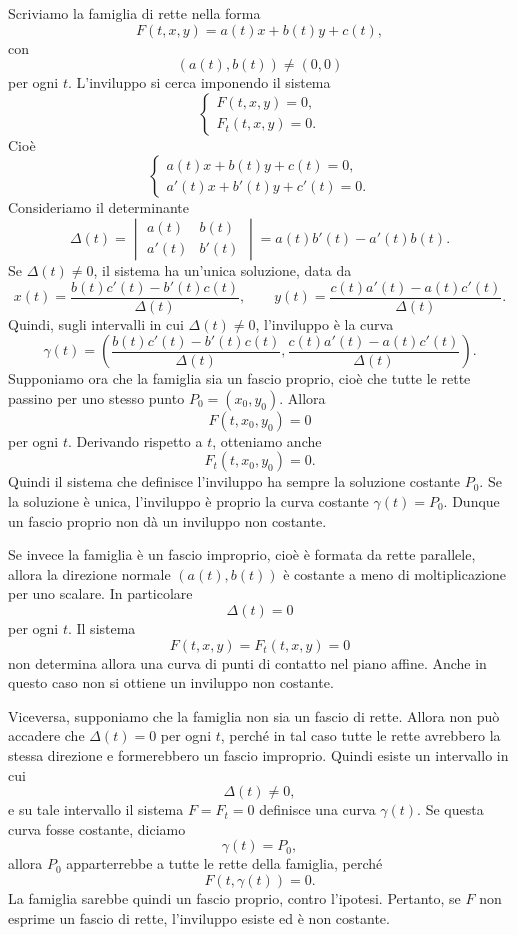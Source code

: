 \documentclass[a4paper]{article}
\begin{document}
\begin{snippetproof}{}
    Scriviamo la famiglia di rette nella forma
    \[
        F(t,x,y)=a(t)x+b(t)y+c(t),
    \]
    con
    \[
        (a(t),b(t))\neq(0,0)
    \]
    per ogni \(t\). L'inviluppo si cerca imponendo il sistema
    \[
        \begin{cases}
            F(t,x,y)=0,\\
            F_t(t,x,y)=0.
        \end{cases}
    \]
    Cioè
    \[
        \begin{cases}
            a(t)x+b(t)y+c(t)=0,\\
            a'(t)x+b'(t)y+c'(t)=0.
        \end{cases}
    \]
    Consideriamo il determinante
    \[
        \Delta(t)=
        \begin{vmatrix}
            a(t) & b(t)\\
            a'(t) & b'(t)
        \end{vmatrix}
        =
        a(t)b'(t)-a'(t)b(t).
    \]
    Se \(\Delta(t)\neq0\), il sistema ha un'unica soluzione, data da
    \[
        x(t)=\frac{b(t)c'(t)-b'(t)c(t)}{\Delta(t)},
        \qquad
        y(t)=\frac{c(t)a'(t)-a(t)c'(t)}{\Delta(t)}.
    \]
    Quindi, sugli intervalli in cui \(\Delta(t)\neq0\), l'inviluppo è la curva
    \[
        \gamma(t)=
        \left(
            \frac{b(t)c'(t)-b'(t)c(t)}{\Delta(t)},
            \frac{c(t)a'(t)-a(t)c'(t)}{\Delta(t)}
        \right).
    \]
    Supponiamo ora che la famiglia sia un fascio proprio, cioè che tutte le rette passino per uno stesso punto \(P_0=(x_0,y_0)\). Allora
    \[
        F(t,x_0,y_0)=0
    \]
    per ogni \(t\). Derivando rispetto a \(t\), otteniamo anche
    \[
        F_t(t,x_0,y_0)=0.
    \]
    Quindi il sistema che definisce l'inviluppo ha sempre la soluzione costante \(P_0\). Se la soluzione è unica, l'inviluppo è proprio la curva costante \(\gamma(t)=P_0\). Dunque un fascio proprio non dà un inviluppo non costante.

    Se invece la famiglia è un fascio improprio, cioè è formata da rette parallele, allora la direzione normale \((a(t),b(t))\) è costante a meno di moltiplicazione per uno scalare. In particolare
    \[
        \Delta(t)=0
    \]
    per ogni \(t\). Il sistema
    \[
        F(t,x,y)=F_t(t,x,y)=0
    \]
    non determina allora una curva di punti di contatto nel piano affine. Anche in questo caso non si ottiene un inviluppo non costante.

    Viceversa, supponiamo che la famiglia non sia un fascio di rette. Allora non può accadere che \(\Delta(t)=0\) per ogni \(t\), perché in tal caso tutte le rette avrebbero la stessa direzione e formerebbero un fascio improprio. Quindi esiste un intervallo in cui
    \[
        \Delta(t)\neq0,
    \]
    e su tale intervallo il sistema \(F=F_t=0\) definisce una curva \(\gamma(t)\). Se questa curva fosse costante, diciamo
    \[
        \gamma(t)=P_0,
    \]
    allora \(P_0\) apparterrebbe a tutte le rette della famiglia, perché
    \[
        F(t,\gamma(t))=0.
    \]
    La famiglia sarebbe quindi un fascio proprio, contro l'ipotesi.
    Pertanto, se \(F\) non esprime un fascio di rette, l'inviluppo esiste ed è non costante.
\end{snippetproof}
\end{document}
